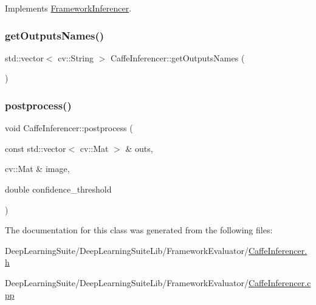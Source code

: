 Implements \hyperlink{class_framework_inferencer_a8fd7e708c8be4471bc2b37a4193a9045}{Framework\+Inferencer}.

\mbox{\label{class_caffe_inferencer_a92db0b7b61f5f7bbfcee3c1905022082}} 
\subsubsection{\texorpdfstring{get\+Outputs\+Names()}{getOutputsNames()}}
{\footnotesize\ttfamily std\+::vector$<$ cv\+::\+String $>$ Caffe\+Inferencer\+::get\+Outputs\+Names (\begin{DoxyParamCaption}{ }\end{DoxyParamCaption})}

\mbox{\label{class_caffe_inferencer_a3eb860abbe252b50d6f17104bf751b62}} 
\subsubsection{\texorpdfstring{postprocess()}{postprocess()}}
{\footnotesize\ttfamily void Caffe\+Inferencer\+::postprocess (\begin{DoxyParamCaption}\item[{const std\+::vector$<$ cv\+::\+Mat $>$ \&}]{outs,  }\item[{cv\+::\+Mat \&}]{image,  }\item[{double}]{confidence\+\_\+threshold }\end{DoxyParamCaption})}



The documentation for this class was generated from the following files\+:\begin{DoxyCompactItemize}
\item 
Deep\+Learning\+Suite/\+Deep\+Learning\+Suite\+Lib/\+Framework\+Evaluator/\hyperlink{_caffe_inferencer_8h}{Caffe\+Inferencer.\+h}\item 
Deep\+Learning\+Suite/\+Deep\+Learning\+Suite\+Lib/\+Framework\+Evaluator/\hyperlink{_caffe_inferencer_8cpp}{Caffe\+Inferencer.\+cpp}\end{DoxyCompactItemize}
